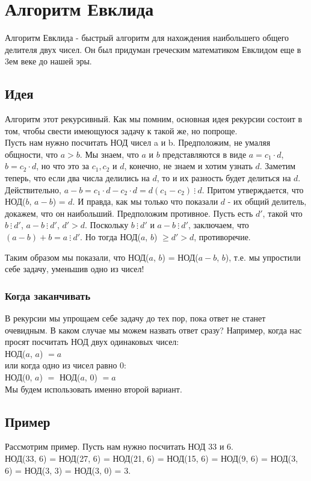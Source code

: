 \documentclass[12pt]{article} %
\begin{document}
\section{Алгоритм Евклида}
Алгоритм Евклида - быстрый алгоритм для нахождения наибольшего общего делителя двух чисел. Он был придуман греческим математиком Евклидом еще в 3ем веке до нашей эры.
\subsection{Идея}
Алгоритм этот рекурсивный. Как мы помним, основная идея рекурсии состоит в том, чтобы свести имеющуюся задачу к такой же, но попроще.\\
Пусть нам нужно посчитать НОД чисел a и b. Предположим, не умаляя общности, что $a > b$. Мы знаем, что $a$ и $b$ представляются в виде $a = c_1 \cdot d$, $b = c_2 \cdot d$, но что это за $c_1, c_2$ и $d$, конечно, не знаем и хотим узнать $d$. Заметим теперь, что если два числа делились на $d$, то и их разность будет делиться на $d$. Действительно, $a - b = c_1\cdot d - c_2 \cdot d = d(c_1 - c_2)\ \vdots\ d$. Притом утверждается, что НОД($b$, $a - b$) = $d$. И правда, как мы только что показали $d$ - их общий делитель, докажем, что он наибольший. Предположим противное. Пусть есть $d'$, такой что $b\ \vdots\ d'$, $a - b\ \vdots\ d'$, $d' > d$. Поскольку $b\ \vdots\ d'$ и $a - b\ \vdots\ d'$, заключаем, что $(a - b) + b = a\ \vdots\ d'$. Но тогда НОД($a$, $b$) $\geq d' > d$, противоречие.

Таким образом мы показали, что НОД($a$, $b$) = НОД($a - b$, $b$), т.е. мы упростили себе задачу, уменьшив одно из чисел!
\subsubsection{Когда заканчивать}
В рекурсии мы упрощаем себе задачу до тех пор, пока ответ не станет очевидным. В каком случае мы можем назвать ответ сразу? Например, когда нас просят посчитать НОД двух одинаковых чисел: \\
НОД($a$, $a$) $= a$\\
или когда одно из чисел равно 0: \\
НОД($0$, $a$) $=$ НОД($a$, $0$) $= a$\\
Мы будем использовать именно второй вариант.
\subsection{Пример}
Рассмотрим пример. Пусть нам нужно посчитать НОД 33 и 6. \\
НОД(33, 6) = НОД(27, 6) = НОД(21, 6) = НОД(15, 6) = НОД(9, 6) = НОД(3, 6) = НОД(3, 3) = НОД(3, 0) = 3.\\
\end{document}

